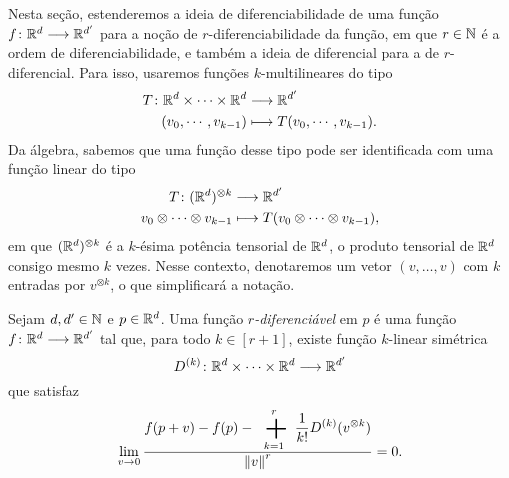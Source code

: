 Nesta seção, estenderemos a ideia de diferenciabilidade de uma função ${f}\colon {\mathbb{R}^d} \longrightarrow {\mathbb{R}^{d'}}$ para a noção de $r$-diferenciabilidade da função, em que $r \in \mathbb{N}$ é a ordem de diferenciabilidade, e também a ideia de diferencial para a de $r$-diferencial. Para isso, usaremos funções $k$-multilineares do tipo
	\begin{align*}
	{T}\colon {\mathbb{R}^d \times \cdots \times \mathbb{R}^d} &\longrightarrow {\mathbb{R}^{d'}} \\{(v_0,\cdots,v_{k-1})} &\longmapsto T(v_0,\cdots,v_{k-1}).
	\end{align*}
Da álgebra, sabemos que uma função desse tipo pode ser identificada com uma função linear do tipo
	\begin{align*}
	{T}\colon {(\mathbb{R}^d)^{\otimes k}} &\longrightarrow {\mathbb{R}^{d'}} \\{v_0 \otimes \cdots \otimes v_{k-1}} &\longmapsto T(v_0 \otimes \cdots \otimes v_{k-1}),
	\end{align*}
em que $(\mathbb{R}^d)^{\otimes k}$ é a $k$-ésima potência tensorial de $\mathbb{R}^d$, o produto tensorial de $\mathbb{R}^d$ consigo mesmo $k$ vezes. Nesse contexto, denotaremos um vetor $(v,\ldots,v)$ com $k$ entradas por $v^{\otimes k}$, o que simplificará a notação.

\begin{definition}
Sejam $d,d' \in \mathbb{N}$ e $p \in \mathbb{R}^d$. Uma função \emph{$r$-diferenciável} em $p$ é uma função ${f}\colon {\mathbb{R}^d} \longrightarrow {\mathbb{R}^{d'}}$ tal que, para todo $k \in [r+1]$, existe função $k$-linear simétrica
	\begin{equation*}
	{D^{(k)}}\colon {\mathbb{R}^d \times \cdots \times \mathbb{R}^d} \longrightarrow {\mathbb{R}^{d'}}
	\end{equation*}
que satisfaz
	\begin{equation*}
	\lim_{v \conv 0} \frac{\displaystyle f(p+v)-f(p)- \sum_{k=1}^r \frac{1}{k!} D^{(k)}(v^{\otimes k})}{\nor{v}^r} = 0.
	\end{equation*}
\end{definition}

